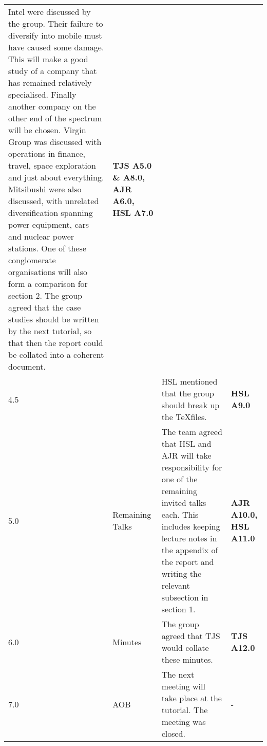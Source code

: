 \begin{center}
\begin{longtable}{| p{} |>{\raggedright\arraybackslash}p{} | p{} |>{\raggedright\arraybackslash}p{}|}
						Intel were discussed by the group. 
						Their failure to diversify into mobile must have caused some damage. 
						This will make a good study of a company that has remained relatively specialised. 
						Finally another company on the other end of the spectrum will be chosen. 
						Virgin Group was discussed with operations in finance, travel, space exploration and just about everything. 
						Mitsibushi were also discussed, with unrelated diversification spanning power equipment, cars and nuclear power stations. 
						One of these conglomerate organisations will also form a comparison for section 2. 
						The group agreed that the case studies should be written by the next tutorial, so that then the report could be collated into a coherent document.			&  \textbf{TJS A5.0 \& A8.0, AJR A6.0, HSL A7.0} \\
4.5	&				&	HSL mentioned that the group should break up the \TeX files. 										&  \textbf{HSL A9.0}	 \\ \hline
5.0	&	Remaining Talks	& 	The team agreed that HSL and AJR will take responsibility for one of the remaining invited talks each. 
						This includes keeping lecture notes in the appendix of the report and writing the relevant subsection in section 1.			& \textbf{AJR A10.0, HSL A11.0} \\ \hline
6.0	&	Minutes		&	The group agreed that TJS would collate these minutes.											& \textbf{TJS A12.0} \\ \hline
7.0	&	AOB			&	The next meeting will take place at the tutorial. The meeting was closed. & - \\ \hline

\end{longtable}
\end{center}

